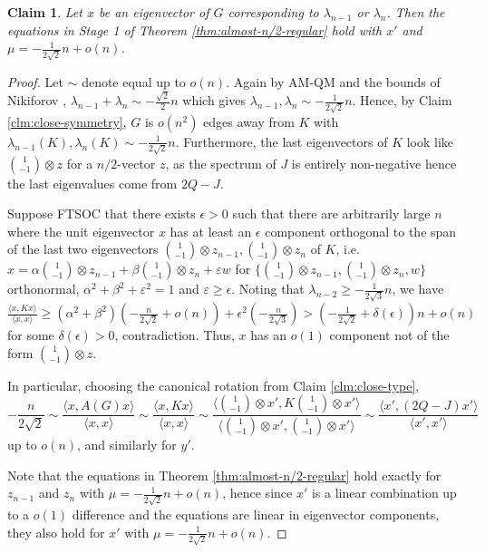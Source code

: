 \documentclass[11pt]{article}
\newtheorem{clm}[thm]{Claim}
\begin{document}
\begin{clm}
    Let $x$ be an eigenvector of $G$ corresponding to $\lambda_{n-1}$ or $\lambda_n$. Then the equations in Stage 1 of Theorem \ref{thm:almost-n/2-regular} hold with $x'$ and $\mu = -\frac{1}{2\sqrt{2}}n + o(n)$. 
\end{clm}
\begin{proof}
    Let $\sim$ denote equal up to $o(n)$. Again by AM-QM and the bounds of Nikiforov \cite{nikiforov2015extrema}, $\lambda_{n-1} + \lambda_n \sim -\frac{\sqrt{2}}{2}n$ which gives $\lambda_{n-1}, \lambda_n \sim -\frac{1}{2\sqrt{2}}n$. Hence, by Claim \ref{clm:close-symmetry}, $G$ is $o(n^2)$ edges away from $K$ with $\lambda_{n-1}(K), \lambda_n(K) \sim -\frac{1}{2\sqrt{2}}n$. Furthermore, the last eigenvectors of $K$ look like $\binom{1}{-1} \otimes z$ for a $n/2$-vector $z$, as the spectrum of $J$ is entirely non-negative hence the last eigenvalues come from $2Q-J$. 

    Suppose FTSOC that there exists $\epsilon > 0$ such that there are arbitrarily large $n$ where the unit eigenvector $x$ has at least an $\epsilon$ component orthogonal to the span of the last two eigenvectors $\binom{1}{-1} \otimes z_{n-1}, \binom{1}{-1} \otimes z_n$ of $K$, i.e. $x = \alpha \binom{1}{-1} \otimes z_{n-1} + \beta \binom{1}{-1} \otimes z_n + \varepsilon w$ for $\{\binom{1}{-1} \otimes z_{n-1}, \binom{1}{-1} \otimes z_n, w\}$ orthonormal, $\alpha^2 + \beta^2 + \varepsilon^2 = 1$ and $\varepsilon \ge \epsilon$. Noting that $\lambda_{n-2} \ge -\frac{1}{2\sqrt{3}}n$, we have $\frac{\langle x, Kx\rangle}{\langle x, x\rangle} \ge (\alpha^2 + \beta^2) (-\frac{n}{2\sqrt{2}} + o(n)) + \epsilon^2 (-\frac{n}{2\sqrt{3}}) > (-\frac{1}{2\sqrt{2}} + \delta(\epsilon))n + o(n)$ for some $\delta(\epsilon) > 0$, contradiction. Thus, $x$ has an $o(1)$ component not of the form $\binom{1}{-1} \otimes z$. 

    In particular, choosing the canonical rotation from Claim \ref{clm:close-type},
    \[-\frac{n}{2\sqrt{2}} \sim \frac{\langle x, A(G)x \rangle}{\langle x, x\rangle} \sim \frac{\langle x, Kx \rangle}{\langle x, x\rangle} \sim \frac{\langle \binom{1}{-1} \otimes x', K \binom{1}{-1} \otimes x' \rangle}{\langle \binom{1}{-1} \otimes x', \binom{1}{-1} \otimes x'\rangle} \sim \frac{\langle x', (2Q-J)x'\rangle}{\langle x', x'\rangle}\]
    up to $o(n)$, and similarly for $y'$. 

    Note that the equations in Theorem \ref{thm:almost-n/2-regular} hold exactly for $z_{n-1}$ and $z_n$ with $\mu = -\frac{1}{2\sqrt{2}}n + o(n)$, hence since $x'$ is a linear combination up to a $o(1)$ difference and the equations are linear in eigenvector components, they also hold for $x'$ with $\mu = -\frac{1}{2\sqrt{2}}n + o(n)$. 
\end{proof}
\end{document}
